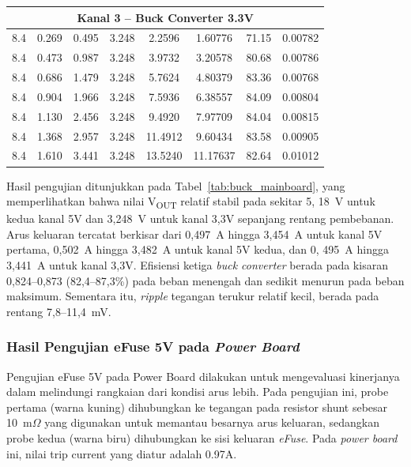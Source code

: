 \begin{table}[H]
\begin{tabular}{cccccccc}
\multicolumn{8}{c}{\textbf{Kanal 3 -- Buck Converter 3.3V}} \\ \hline
8.4 & 0.269 & 0.495 & 3.248 & 2.2596 & 1.60776 & 71.15 & 0.00782 \\
8.4 & 0.473 & 0.987 & 3.248 & 3.9732 & 3.20578 & 80.68 & 0.00786 \\
8.4 & 0.686 & 1.479 & 3.248 & 5.7624 & 4.80379 & 83.36 & 0.00768 \\
8.4 & 0.904 & 1.966 & 3.248 & 7.5936 & 6.38557 & 84.09 & 0.00804 \\
8.4 & 1.130 & 2.456 & 3.248 & 9.4920 & 7.97709 & 84.04 & 0.00815 \\
8.4 & 1.368 & 2.957 & 3.248 & 11.4912 & 9.60434 & 83.58 & 0.00905 \\
8.4 & 1.610 & 3.441 & 3.248 & 13.5240 & 11.17637 & 82.64 & 0.01012 \\ \hline
\end{tabular}
\end{table}
Hasil pengujian ditunjukkan pada Tabel~\ref{tab:buck_mainboard}, yang
memperlihatkan bahwa nilai V\textsubscript{OUT} relatif stabil pada sekitar 5{,
}18~V untuk kedua kanal 5V dan 3{,}248~V untuk kanal 3{,}3V sepanjang rentang
pembebanan. Arus keluaran tercatat berkisar dari 0{,}497~A hingga 3{,}454~A
untuk kanal 5V pertama, 0{,}502~A hingga 3{,}482~A untuk kanal 5V kedua, dan 0{,
}495~A hingga 3{,}441~A untuk kanal 3{,}3V. Efisiensi ketiga \emph{buck
converter} berada pada kisaran 0{,}824--0{,}873 (82{,}4--87{,}3\%) pada beban
menengah dan sedikit menurun pada beban maksimum. Sementara itu, \emph{ripple}
tegangan terukur relatif kecil, berada pada rentang 7{,}8--11{,}4~mV.

\subsubsection{Hasil Pengujian eFuse 5V pada \emph{Power Board}}
Pengujian eFuse 5V pada Power Board dilakukan untuk mengevaluasi kinerjanya
dalam melindungi rangkaian dari kondisi arus lebih. Pada pengujian ini, probe
pertama (warna kuning) dihubungkan ke tegangan pada resistor shunt sebesar
10~m$\Omega$ yang digunakan untuk memantau besarnya arus keluaran, sedangkan
probe kedua (warna biru) dihubungkan ke sisi keluaran \textit{eFuse}. Pada
\emph{power board} ini, nilai trip current yang diatur adalah 0.97A.


